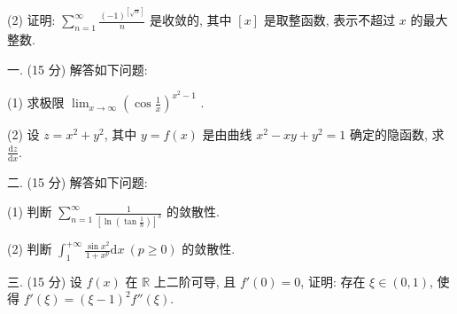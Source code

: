 \documentclass{examcollection}
\begin{document}
{\begin{minipage}{\textwidth}
(2) 证明: $\sum_{n=1}^{\infty} \frac{(-1)^{[\sqrt{n}]}}{n}$ 是收敛的, 其中 $[x]$ 是取整函数, 表示不超过 $x$ 的最大整数.\par
{}\smallskip
一. (15 分) 解答如下问题:\par
(1) 求极限  $\lim_{x\to\infty}\left(\cos\frac{1}{x}\right)^{x^{2}-1}$ .\par
(2) 设 $z = x^{2} + y^{2}$, 其中 $y = f(x)$ 是由曲线 $x^{2} - xy + y^{2} = 1$ 确定的隐函数, 求 $\frac{\mathrm{d}z}{\mathrm{d}x}$.\par
二. (15 分) 解答如下问题:\par
(1) 判断 $\sum_{n=1}^{\infty} \frac{1}{\left[\ln \left(\tan \frac{1}{n}\right)\right]^3}$ 的敛散性.\par
(2) 判断  $\int_{1}^{+\infty}\frac{\sin x^{2}}{1+x^{p}}\mathrm{d}x\ (p\geq0)$  的敛散性.\par
三. (15 分) 设 $f(x)$ 在 $\mathbb{R}$ 上二阶可导, 且 $f'(0) = 0$, 证明: 存在 $\xi \in (0,1)$, 使得 $f'(\xi) = (\xi - 1)^2 f''(\xi)$.\par
\end{minipage}}
\ifdim\dimexpr\ht\proofbox+\dp\proofbox\relax>\textheight
\noindent\resizebox{!}{\textheight}{\usebox{\proofbox}}\else\noindent\usebox{\proofbox}\fi\clearpage
\end{document}
